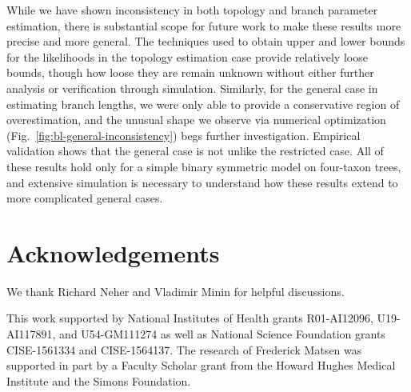 \documentclass{article}
\newcommand{\beginsupplement}{%
        \setcounter{table}{0}
        \renewcommand{\thetable}{S\arabic{table}}%
        \setcounter{figure}{0}
        \renewcommand{\thefigure}{S\arabic{figure}}%
     }
\begin{document}
While we have shown inconsistency in both topology and branch parameter estimation, there is substantial scope for future work to make these results more precise and more general.
The techniques used to obtain upper and lower bounds for the likelihoods in the topology estimation case provide relatively loose bounds, though how loose they are remain unknown without either further analysis or verification through simulation.
Similarly, for the general case in estimating branch lengths, we were only able to provide a conservative region of overestimation, and the unusual shape we observe via numerical optimization (Fig.~\ref{fig:bl-general-inconsistency}) begs further investigation.
Empirical validation shows that the general case is not unlike the restricted case.
All of these results hold only for a simple binary symmetric model on four-taxon trees, and extensive simulation is necessary to understand how these results extend to more complicated general cases.


\section*{Acknowledgements}
We thank Richard Neher and Vladimir Minin for helpful discussions.

This work supported by National Institutes of Health grants R01-AI12096, U19-AI117891, and U54-GM111274 as well as National Science Foundation grants CISE-1561334 and CISE-1564137.
The research of Frederick Matsen was supported in part by a Faculty Scholar grant from the Howard Hughes Medical Institute and the Simons Foundation.




\newpage
\beginsupplement


\end{document}
